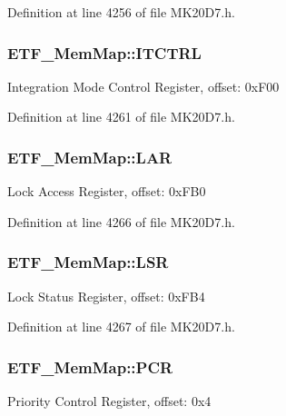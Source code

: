 Definition at line 4256 of file M\+K20\+D7.\+h.

\subsubsection[{\texorpdfstring{I\+T\+C\+T\+RL}{ITCTRL}}]{ E\+T\+F\+\_\+\+Mem\+Map\+::\+I\+T\+C\+T\+RL}\hypertarget{struct_e_t_f___mem_map_a287d5070161434a42360e126bd310a1a}{}\label{struct_e_t_f___mem_map_a287d5070161434a42360e126bd310a1a}
Integration Mode Control Register, offset\+: 0x\+F00 

Definition at line 4261 of file M\+K20\+D7.\+h.

\subsubsection[{\texorpdfstring{L\+AR}{LAR}}]{ E\+T\+F\+\_\+\+Mem\+Map\+::\+L\+AR}\hypertarget{struct_e_t_f___mem_map_ac5caea67f9fed40ab8f183954f6401a8}{}\label{struct_e_t_f___mem_map_ac5caea67f9fed40ab8f183954f6401a8}
Lock Access Register, offset\+: 0x\+F\+B0 

Definition at line 4266 of file M\+K20\+D7.\+h.

\subsubsection[{\texorpdfstring{L\+SR}{LSR}}]{ E\+T\+F\+\_\+\+Mem\+Map\+::\+L\+SR}\hypertarget{struct_e_t_f___mem_map_a404d7b7ce01537cb61bbb7c2d2ec1de5}{}\label{struct_e_t_f___mem_map_a404d7b7ce01537cb61bbb7c2d2ec1de5}
Lock Status Register, offset\+: 0x\+F\+B4 

Definition at line 4267 of file M\+K20\+D7.\+h.

\subsubsection[{\texorpdfstring{P\+CR}{PCR}}]{ E\+T\+F\+\_\+\+Mem\+Map\+::\+P\+CR}\hypertarget{struct_e_t_f___mem_map_aa50938e7ba3b91d0bc8417397ef82267}{}\label{struct_e_t_f___mem_map_aa50938e7ba3b91d0bc8417397ef82267}
Priority Control Register, offset\+: 0x4 

